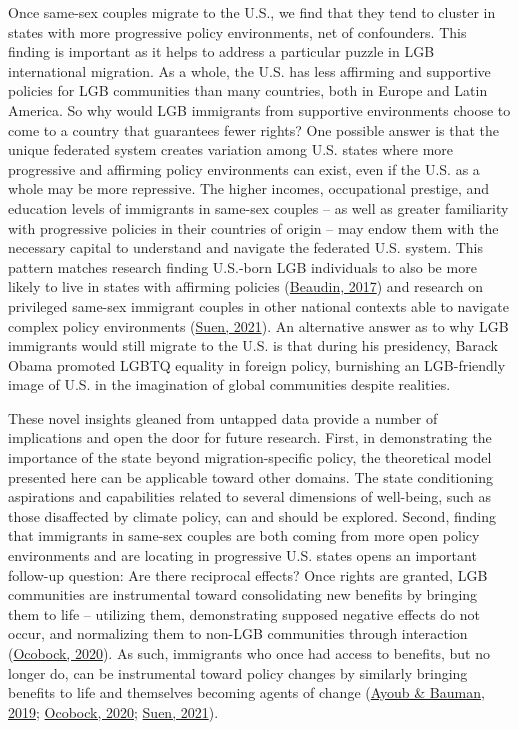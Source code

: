 \documentclass[
  11pt,
]{article}
\begin{document}
Once same-sex couples migrate to the U.S., we find that they tend to cluster in states with more progressive policy environments, net of confounders. This finding is important as it helps to address a particular puzzle in LGB international migration. As a whole, the U.S. has less affirming and supportive policies for LGB communities than many countries, both in Europe and Latin America. So why would LGB immigrants from supportive environments choose to come to a country that guarantees fewer rights? One possible answer is that the unique federated system creates variation among U.S. states where more progressive and affirming policy environments can exist, even if the U.S. as a whole may be more repressive. The higher incomes, occupational prestige, and education levels of immigrants in same-sex couples -- as well as greater familiarity with progressive policies in their countries of origin -- may endow them with the necessary capital to understand and navigate the federated U.S. system. This pattern matches research finding U.S.-born LGB individuals to also be more likely to live in states with affirming policies (\protect\hyperlink{ref-beaudin_2017}{Beaudin, 2017}) and research on privileged same-sex immigrant couples in other national contexts able to navigate complex policy environments (\protect\hyperlink{ref-suen_2021_sexual}{Suen, 2021}). An alternative answer as to why LGB immigrants would still migrate to the U.S. is that during his presidency, Barack Obama promoted LGBTQ equality in foreign policy, burnishing an LGB-friendly image of U.S. in the imagination of global communities despite realities.

These novel insights gleaned from untapped data provide a number of implications and open the door for future research. First, in demonstrating the importance of the state beyond migration-specific policy, the theoretical model presented here can be applicable toward other domains. The state conditioning aspirations and capabilities related to several dimensions of well-being, such as those disaffected by climate policy, can and should be explored. Second, finding that immigrants in same-sex couples are both coming from more open policy environments and are locating in progressive U.S. states opens an important follow-up question: Are there reciprocal effects? Once rights are granted, LGB communities are instrumental toward consolidating new benefits by bringing them to life -- utilizing them, demonstrating supposed negative effects do not occur, and normalizing them to non-LGB communities through interaction (\protect\hyperlink{ref-ocobock_2020_leveraging}{Ocobock, 2020}). As such, immigrants who once had access to benefits, but no longer do, can be instrumental toward policy changes by similarly bringing benefits to life and themselves becoming agents of change (\protect\hyperlink{ref-ayoub_2019_migration}{Ayoub \& Bauman, 2019}; \protect\hyperlink{ref-ocobock_2020_leveraging}{Ocobock, 2020}; \protect\hyperlink{ref-suen_2021_sexual}{Suen, 2021}).
\end{document}
